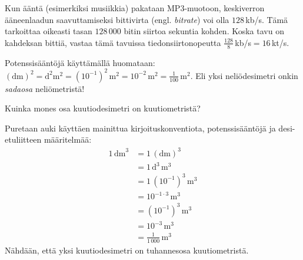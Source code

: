 \begin{esimerkki}
Kun ääntä (esimerkiksi musiikkia) pakataan MP3-muotoon, keskiverron ääneenlaadun saavuttamiseksi bittivirta (engl. \textit{bitrate}) voi olla $128$\,kb/s. Tämä tarkoittaa oikeasti tasan $128\,000$ bitin siirtoa sekuntia kohden. Koska tavu on kahdeksan bittiä, vastaa tämä tavuissa tiedonsiirtonopeutta $\frac{128}{8}$\,kb/s$=16$\,kt/s.
\end{esimerkki}


\begin{esimerkki}
Potenssisääntöjä käyttämällä huomataan: $(\text{dm})^2=\text{d}^2\text{m}^2=(10^{-1})^2\, \text{m}^2=10^{-2}\,\text{m}^2=\frac{1}{100}\, \text{m}^2$. Eli yksi neliödesimetri onkin \textit{sadaosa} neliömetristä!
\end{esimerkki}

\begin{esimerkki}
Kuinka mones osa kuutiodesimetri on kuutiometristä?
	\begin{esimratk}
	Puretaan auki käyttäen mainittua kirjoituskonventiota, potenssisääntöjä ja desi-etuliitteen määritelmää:
	\begin{align*}
	1\,\text{dm}^3&=1\,(\text{dm})^3\\
	&=1\,\text{d}^3\,\text{m}^3 \\
	&=1\,(10^{-1})^3\,\text{m}^3 \\
	&=10^{-1\cdot3}\,\text{m}^3 \\
	&=(10^{-1})^3\,\text{m}^3 \\
	&=10^{-3}\,\text{m}^3 \\
	&=\frac{1}{1\,000}\,\text{m}^3
	\end{align*}
	Nähdään, että yksi kuutiodesimetri on tuhannesosa kuutiometristä.
	\end{esimratk}
\end{esimerkki}


